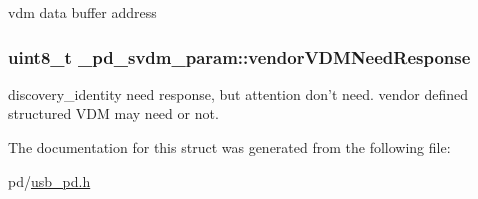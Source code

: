 vdm data buffer address \hypertarget{struct__pd__svdm__param_a2a41729be5b45c14a61c39498b0f43be}{
\subsubsection[{vendor\-V\-D\-M\-Need\-Response}]{\setlength{\rightskip}{0pt plus 5cm}uint8\-\_\-t \-\_\-pd\-\_\-svdm\-\_\-param\-::vendor\-V\-D\-M\-Need\-Response}}\label{struct__pd__svdm__param_a2a41729be5b45c14a61c39498b0f43be}
discovery\-\_\-identity need response, but attention don't need. vendor defined structured V\-D\-M may need or not. 

The documentation for this struct was generated from the following file\-:\begin{DoxyCompactItemize}
\item 
pd/\hyperlink{usb__pd_8h}{usb\-\_\-pd.\-h}\end{DoxyCompactItemize}
